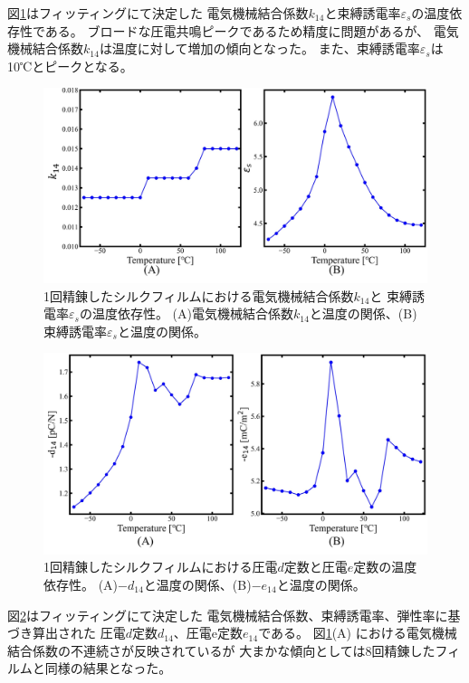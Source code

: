 \documentclass[dvipdfmx,12pt,a4paper]{jreport}
\begin{document}
			図\ref{1回_電気機械結合係数_束縛誘電率_温度依存性}はフィッティングにて決定した
			電気機械結合係数$k_{14}$と束縛誘電率$\varepsilon_s$の温度依存性である。
			ブロードな圧電共鳴ピークであるため精度に問題があるが、
			電気機械結合係数$k_{14}$は温度に対して増加の傾向となった。
			また、束縛誘電率$\varepsilon_s$は10℃とピークとなる。
			\begin{figure}[h]
				\centering
				\includegraphics[width=\linewidth]{1回_電気機械結合係数_誘電率.jpg}
				\caption{1回精錬したシルクフィルムにおける電気機械結合係数$k_{14}$と
				束縛誘電率$\varepsilon_s$の温度依存性。
				(A)電気機械結合係数$k_{14}$と温度の関係、(B)束縛誘電率$\varepsilon_s$と温度の関係。}
				\label{1回_電気機械結合係数_束縛誘電率_温度依存性}
			\end{figure}
			\begin{figure}[H]
				\centering
				\includegraphics[width=\linewidth]{1回_d定数_e定数_温度依存性.jpg}
				\caption{1回精錬したシルクフィルムにおける圧電$d$定数と圧電$e$定数の温度依存性。
				(A)$-d_{14}$と温度の関係、(B)$-e_{14}$と温度の関係。}
				\label{1回_d定数_e定数_温度依存性}
			\end{figure}
			\newpage
			図\ref{1回_d定数_e定数_温度依存性}はフィッティングにて決定した
			電気機械結合係数、束縛誘電率、弾性率に基づき算出された
			圧電$d$定数$d_{14}$、圧電e定数$e_{14}$である。
			図\ref{1回_電気機械結合係数_束縛誘電率_温度依存性}(A)
			における電気機械結合係数の不連続さが反映されているが
			大まかな傾向としては8回精錬したフィルムと同様の結果となった。
\end{document}
